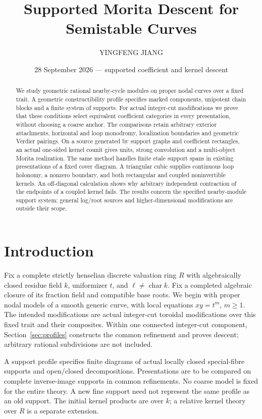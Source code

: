 \documentclass[11pt]{article}
\title{Supported Morita Descent for Semistable Curves}
\author{YINGFENG JIANG}
\date{28 September 2026 --- supported coefficient and kernel descent}
\theoremstyle{definition}
\theoremstyle{remark}
\begin{document}
\maketitle
\begin{abstract}
We study geometric rational nearby-cycle modules on proper nodal
curves over a fixed trait. A geometric constructibility profile
specifies marked components, unipotent chain blocks and a finite
system of supports. For actual integer-cut modifications we prove
that these conditions select equivalent coefficient categories in
every presentation, without choosing a coarse anchor. The comparisons
retain arbitrary exterior attachments, horizontal and loop monodromy,
localization boundaries and geometric Verdier pairings.
On a source generated by support graphs and coefficient rectangles,
an actual one-sided kernel counit gives units, strong convolution
and a multi-object Morita realization. The same method handles
finite etale support spans in existing presentations of a fixed
cover diagram. A triangular cubic supplies continuous loop holonomy,
a nonzero boundary, and both rectangular and coupled noninvertible
kernels. An off-diagonal calculation shows why arbitrary independent
contraction of the endpoints of a coupled kernel fails.
The results concern the specified nearby-module support system;
general log/root sources and higher-dimensional modifications are
outside their scope.
\end{abstract}

\section{Introduction}
\label{sec:introduction}
Fix a complete strictly henselian discrete valuation ring $R$ with
algebraically closed residue field $k$, uniformizer $t$, and
$\ell\ne\operatorname{char}k$.  Fix a completed algebraic closure of its
fraction field and compatible base roots.  We begin with proper nodal
models of a smooth generic curve, with local equations $xy=t^m$,
$m\geq1$.  The intended modifications are actual integer-cut toroidal
modifications over this fixed trait and their composites.  Within one connected integer-cut component,
Section~\ref{sec:profiles} constructs the common refinement and proves
descent; arbitrary rational subdivisions are not included.

A support profile specifies finite diagrams of actual locally closed
special-fibre supports and open/closed decompositions.  Presentations
are to be compared on complete inverse-image supports in common
refinements.  No coarse model is fixed for the entire theory.  A new
fine support need not represent the same profile as an old support.
The initial kernel products are over $k$; a relative kernel theory over
$R$ is a separate extension.
\end{document}
